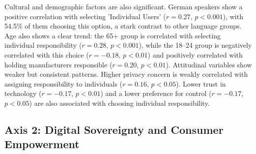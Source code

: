 		Cultural and demographic factors are also significant. German speakers show a positive correlation with selecting 'Individual Users' ($r = 0.27$, $p < 0.001$), with 54.5\% of them choosing this option, a stark contrast to other language groups. Age also shows a clear trend: the 65+ group is correlated with selecting individual responsibility ($r = 0.28$, $p < 0.001$), while the 18--24 group is negatively correlated with this choice ($r = -0.18$, $p < 0.01$) and positively correlated with holding manufacturers responsible ($r = 0.20$, $p < 0.01$).
		Attitudinal variables show weaker but consistent patterns. Higher privacy concern is weakly correlated with assigning responsibility to individuals ($r = 0.16$, $p < 0.05$). Lower trust in technology ($r = -0.17$, $p < 0.01$) and a lower preference for control ($r = -0.17$, $p < 0.05$) are also associated with choosing individual responsibility.
\subsection{Axis 2: Digital Sovereignty and Consumer Empowerment}
